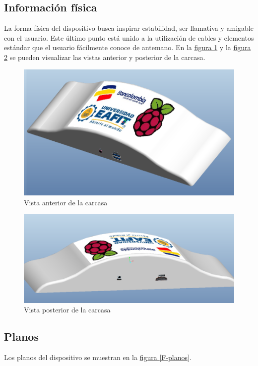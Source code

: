 \documentclass[11pt,lettersize]{article} %
\newcommand{\figura}[1]{\hyperref[{#1}]{figura \ref*{#1}}}
\begin{document}
\subsection{Información  física}
La forma física del dispositivo busca inspirar estabilidad, ser llamativa y amigable con el usuario. Este último punto está unido a la utilización de cables y elementos estándar que el usuario fácilmente conoce de antemano. En la \figura{F-carcasa-anterior} y la \figura{F-carcasa-posterior} se pueden visualizar las vistas anterior y posterior de la carcasa.

\begin{figure}[h!]
	\centering
	\includegraphics[width=.6\textwidth]{images/carcasa-anterior.png}
	\caption{Vista anterior de la carcasa}
	\label{F-carcasa-anterior}
\end{figure}
\begin{figure}[h!]
	\centering
	\includegraphics[width=.6\textwidth]{images/carcasa-posterior.png}
	\caption{Vista posterior de la carcasa}
	\label{F-carcasa-posterior}
\end{figure}


\subsection{Planos}
Los planos del dispositivo se muestran en la \figura{F-planos}.
\cleardoublepage
\end{document}
